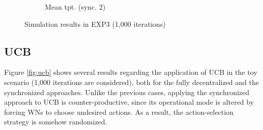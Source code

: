 \documentclass[preprint,12pt]{article}
\begin{document}
\begin{figure}[h!]
\begin{subfigure}[b]{.3\textwidth}
		\caption{Mean tpt. (sync. 2)}\label{fig:mean_tpt_CEXP3}
	\end{subfigure}
	\caption{Simulation results in EXP3 (1,000 iterations)}
	\label{fig:exp3}
\end{figure}

\subsection{UCB}
\label{section:ucb}

Figure \ref{fig:ucb} shows several results regarding the application of UCB in the toy scenario (1,000 iterations are considered), both for the fully decentralized and the synchronized approaches. Unlike the previous cases, applying the synchronized approach to UCB is counter-productive, since its operational mode is altered by forcing WNs to choose undesired actions. As a result, the action-selection strategy is somehow randomized.
\end{document}
